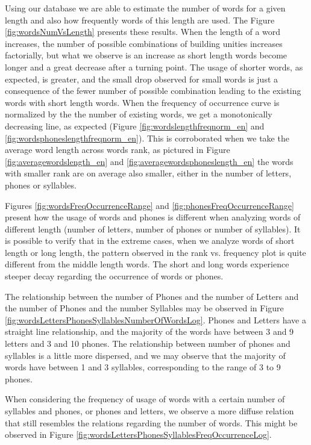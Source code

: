 Using our database we are able to estimate the number of words for a given length and
also how frequently words of this length are used. The Figure \ref{fig:wordsNumVsLength} presents
these results. When the length of a word increases, the number of possible combinations of
building unities increases factorially, but what we observe is an increase as short length words
become longer and a great decrease after a turning point. The usage of shorter words, as expected,
is greater, and the small drop observed for small words is just a consequence of the fewer 
number of possible combination leading to the existing words with short length words. 
When the frequency of occurrence curve is normalized
by the the number of existing words, we get a monotonically decreasing line, as expected 
(Figure \ref{fig:wordslengthfreqnorm_en} and \ref{fig:wordsphoneslengthfreqnorm_en}). 
This is corroborated when we take the average word length across
words rank, as pictured in Figure \ref{fig:averagewordslength_en} and \ref{fig:averagewordsphoneslength_en}
the words with smaller rank are on average also smaller, either in the number of letters, phones
or syllables.

Figures \ref{fig:wordsFreqOccurrenceRange} and \ref{fig:phonesFreqOccurrenceRange}
present how the usage of words and phones is different when analyzing words of different
length (number of letters, number of phones or number of syllables).
It is possible to verify that in the extreme cases, when we analyze words of short length or 
long length, the pattern observed in the rank vs. frequency plot is quite different from the
middle length words. The short and long words experience steeper decay regarding the occurrence
of words or phones.


The relationship between the number of Phones and the number of Letters and 
the number of Phones and the number Syllables may be observed in 
Figure \ref{fig:wordsLettersPhonesSyllablesNumberOfWordsLog}.
Phones and Letters have a straight line relationship, and the majority of the words
have between 3 and 9 letters and 3 and 10 phones.
The relationship between number of phones and syllables is a little more dispersed,
and we may observe that the majority of words have between 1 and 3 syllables, corresponding
to the range of 3 to 9 phones. 

When considering the frequency of usage of words with a certain number of syllables and phones,
or phones and letters, we observe a more diffuse relation that still resembles the relations
regarding the number of words. This might be observed in 
Figure \ref{fig:wordsLettersPhonesSyllablesFreqOccurrenceLog}.

